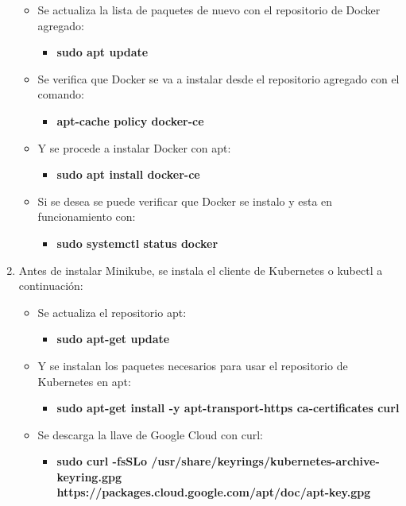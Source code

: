 \begin{enumerate}
\begin{itemize}
\begin{itemize}
        \end{itemize}
        \item Se actualiza la lista de paquetes de nuevo con el repositorio de Docker agregado:
        \begin{itemize}
            \item \textbf{sudo apt update}
        \end{itemize}
        \item Se verifica que Docker se va a instalar desde el repositorio agregado con el comando:
        \begin{itemize}
            \item \textbf{apt-cache policy docker-ce}
        \end{itemize}
        \item Y se procede a instalar Docker con apt:
        \begin{itemize}
            \item \textbf{sudo apt install docker-ce}
        \end{itemize}
        \item Si se desea se puede verificar que Docker se instalo y esta en funcionamiento con:
        \begin{itemize}
            \item \textbf{sudo systemctl status docker}
        \end{itemize}
    \end{itemize}
    \item Antes de instalar Minikube, se instala el cliente de Kubernetes o kubectl a continuación:
    \begin{itemize}
        \item Se actualiza el repositorio apt:
        \begin{itemize}
            \item \textbf{sudo apt-get update}
        \end{itemize}
        \item Y se instalan los paquetes necesarios para usar el repositorio de Kubernetes en apt:
        \begin{itemize}
            \item \textbf{sudo apt-get install -y apt-transport-https ca-certificates curl}
        \end{itemize}
        \item Se descarga la llave de Google Cloud con curl:
        \begin{itemize}
            \item \textbf{sudo curl -fsSLo /usr/share/keyrings/kubernetes-archive-keyring.gpg \\https://packages.cloud.google.com/apt/doc/apt-key.gpg}

\end{itemize}
\end{itemize}
\end{enumerate}
